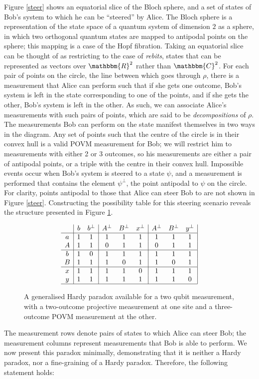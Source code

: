 \documentclass[reprint]{revtex4-1}
\theoremstyle{definition}
\begin{document}
Figure \ref{steer} shows an equatorial slice of the Bloch sphere, and a set of states of Bob's system to which he can be ``steered'' by Alice.  The Bloch sphere is a representation of the state space of a quantum system of dimension $2$ as a sphere, in which two orthogonal quantum states are mapped to antipodal points on the sphere; this mapping is a case of the Hopf fibration. Taking an equatorial slice can be thought of as restricting to the case of \emph{rebits}, states that can be represented as vectors over $\mathbbm{R}^2$ rather than $\mathbbm{C}^2$.
For each pair of points on the circle, the line between which goes through $\rho$, there is a measurement that Alice can perform such that if she gets one outcome, Bob's system is left in the state corresponding to one of the points, and if she gets the other, Bob's system is left in the other. As such, we can associate Alice's measurements with such pairs of points, which are said to be \emph{decompositions} of $\rho$. The measurements Bob can perform on the state manifest themselves in two ways in the diagram. Any set of points such that the centre of the circle is in their convex hull is a valid POVM measurement for Bob; we will restrict him to measurements with either 2 or 3 outcomes, so his measurements are either a pair of antipodal points, or a triple with the centre in their convex hull. Impossible events occur when Bob's system is steered to a state $\psi$, and a measurement is performed that contains the element $\psi^\perp$, the point antipodal to $\psi$ on the circle. For clarity, points antipodal to those that Alice can steer Bob to are not shown in Figure \ref{steer}. Constructing the possibility table for this steering scenario reveals the structure presented in Figure \ref{novelArray}.
\begin{figure}
\begin{equation*}
\begin{array}{ c  | c c | c c c| c c c|}\
  & b&b^\perp& A^\perp &B^\perp&x^\perp& A^\perp &B^\perp&y^\perp \\ \hline
  a &1&1&1&1&1&1&1&1\\ 
  A &1&1&0&1&1&0&1&1\\ \hline
  b &1&0&1&1&1&1&1&1\\ 
 B  &1&1&1&0&1&1&0&1\\ \hline
 x &1&1&1&1&0&1&1&1\\ 
 y &1&1&1&1&1&1&1&0\\ \hline
\end{array}
\end{equation*}
\caption{A generalised Hardy paradox available for a two qubit measurement, with a two-outcome projective measurement at one site and a three-outcome POVM measurement at the other.}
\label{novelArray}
\end{figure}
The measurement rows denote pairs of states to which Alice can steer Bob; the measurement columns represent measurements that Bob is able to perform.
We now present this paradox minimally, demonstrating that it is neither a Hardy paradox, nor a fine-graining of a Hardy paradox. Therefore, the following statement holds:
\end{document}
